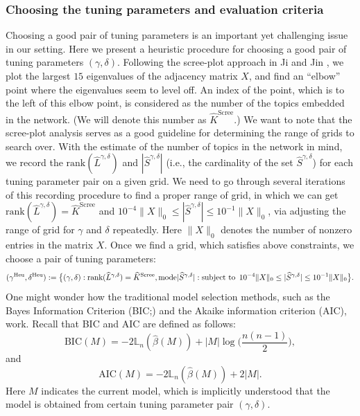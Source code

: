 \documentclass[AMS,STIX1COL]{WileyNJD-v2}
\newcommand{\Hquad}{\hspace{0.5em}}
\begin{document}
{\subsubsection{Choosing the tuning parameters and evaluation criteria} \label{sec:Eval-crit}
Choosing a good pair of tuning parameters is an important yet challenging issue in our setting.
Here we present a heuristic procedure for choosing a good pair of tuning parameters $(\gamma,\delta)$.
Following the scree-plot approach in Ji and Jin \cite{ji2016coauthorship}, we plot the largest $15$ eigenvalues of the adjacency matrix $X$, and find an ``elbow'' point where the eigenvalues seem to level off.
An index of the point, which is to the left of this elbow point, is considered as the number of the topics embedded in the network.
(We will denote this number as $\widehat{K}^{\text{Scree}}$.)
We want to note that the scree-plot analysis serves as a good guideline for determining the range of grids to search over.
With the estimate of the number of topics in the network in mind, we record the $\text{rank}(\widehat{L}^{\gamma,\delta})$ and $|\widehat{S}^{\gamma,\delta}|$ (i.e., the cardinality of the set $\widehat{S}^{\gamma,\delta}$) for each tuning parameter pair on a given grid.
We need to go through several iterations of this recording procedure to find a proper range of grid, in which we can get $\text{rank}(\widehat{L}^{\gamma,\delta})=\widehat{K}^{\text{Scree}}$
and $10^{-4}\|X\|_0 \leq |\widehat{S}^{\gamma,\delta}| \leq 10^{-1}\|X\|_0$, via adjusting the range of grid for $\gamma$ and $\delta$ repeatedly.
Here $\|X\|_0$ denotes the number of nonzero entries in the matrix $X$.
Once we find a grid, which satisfies above constraints, we choose a pair of tuning parameters: %
\[
    (\gamma^{\text{Heu}},\delta^{\text{Heu}}):=
    \big\{(\gamma,\delta): \text{rank}(\widehat{L}^{\gamma,\delta})=\widehat{K}^{\text{Scree}},
    \mbox{mode} |\widehat{S}^{\gamma,\delta}|: \mbox{subject to} \Hquad 10^{-4}\|X\|_0 \leq |\widehat{S}^{\gamma,\delta}| \leq 10^{-1}\|X\|_0 \big\}.
\]
One might wonder how the traditional model selection methods, such as the Bayes Information Criterion (BIC;\cite{schwarz1978estimating}) and the Akaike information criterion (AIC), work.
Recall that BIC and AIC are defined as follows:
\[
\mbox{BIC}(M) = -2  \mathbb{L}_n( \hat{\beta}(M)) + |M| \log \bigg(\frac{n(n-1)}{2}\bigg),
\]
and
\[
\mbox{AIC}(M) = -2  \mathbb{L}_n( \hat{\beta}(M)) + 2|M|.
\]
Here $M$ indicates the current model, which is implicitly understood that the model is obtained from certain tuning parameter pair $(\gamma,\delta)$.
}
\end{document}
